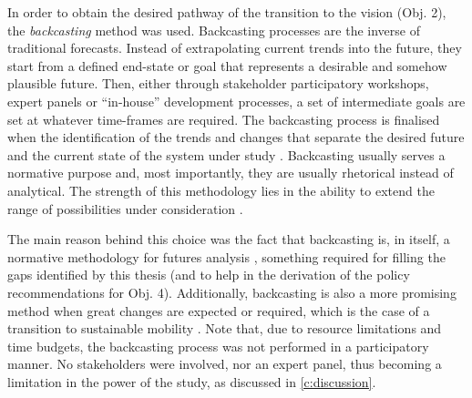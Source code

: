In order to obtain the desired pathway of the transition to the vision (Obj. 2), the \emph{backcasting} method was used. Backcasting processes are the inverse of traditional forecasts. Instead of extrapolating current trends into the future, they start from a defined end-state or goal that represents a desirable and somehow plausible future. Then, either through stakeholder participatory workshops, expert panels or ``in-house'' development processes, a set of intermediate goals are set at whatever time-frames are required. The backcasting process is finalised when the identification of the trends and changes that separate the desired future and the current state of the system under study \parencite{dreborg1996_Essencebackcasting}. Backcasting usually serves a normative purpose and, most importantly, they are usually rhetorical instead of analytical. The strength of this methodology lies in the ability to extend the range of possibilities under consideration \parencite{mcdowall2006_Forecastsscenariosvisions}.

The main reason behind this choice was the fact that backcasting is, in itself, a normative methodology for futures analysis \parencite{boerjeson2006_Scenariotypestechniques,mcdowall2006_Forecastsscenariosvisions}, something required for filling the gaps identified by this thesis (and to help in the derivation of the policy recommendations for Obj. 4). Additionally, backcasting is also a more promising method when great changes are expected or required, which is the case of a transition to sustainable mobility \parencite{hoejer2000_Determinismbackcastingfuture}. Note that, due to resource limitations and time budgets, the backcasting process was not performed in a participatory manner. No stakeholders were involved, nor an expert panel, thus becoming a limitation in the power of the study, as discussed in \cref{c:discussion}.